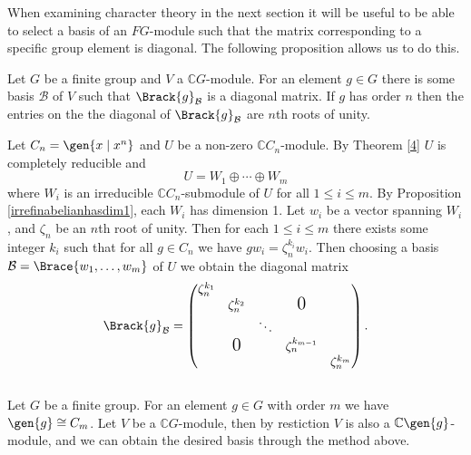 \documentclass[../Project.tex]{subfiles}
\begin{document}
When examining character theory in the next section it will be useful to be able to select a basis of an $FG$-module such that the matrix corresponding to a specific group element is diagonal. The following proposition allows us to do this.

\begin{prop}[{\cite[proposition 9.11]{2}}]
	Let $G$ be a finite group and $V $ a $\mathbb{C}G$-module. For an element $g \in G$ there is some basis $\mathcal{B}$ of $V$  such that $\Brack{g}_\mathcal{B}$ is a diagonal matrix. If $g$ has order $n$ then the entries on the the diagonal of $\Brack{g}_\mathcal{B}$ are $n$th roots of unity.
	\label{diagonalizable}
\end{prop}
\begin{proo*}[{\cite[Proposition 9.11]{2}}]
	Let $C_n = \gen{x \;\vert\; x^n}$ and $U$ be a non-zero $\mathbb{C}C_n$-module. By Theorem \ref{4} $U$ is completely reducible and
	$$U = W_1 \oplus \cdots \oplus W_m$$
	where $W_i$ is an irreducible $\mathbb{C}C_n$-submodule of $U$ for all $1 \leqslant i \leqslant m$. By Proposition \ref{irrefinabelianhasdim1}, each $W_i$ has dimension 1. Let $w_i$ be a vector spanning $W_i$, and $\zeta_n$ be an $n$th root of unity. Then for each $1 \leqslant i \leqslant m$ there exists some integer $k_i$ such that for all $g \in C_n$ we have $gw_i = \zeta_n^{k_i}w_i$. Then choosing a basis $\mathcal{B} = \Brace{w_1,\dots,w_m}$ of $U$ we obtain the diagonal matrix
	$$\Brack{g}_\mathcal{B} = \begin{pmatrix}
	\zeta_n^{k_1} &  & &  & \\
	 & \zeta_n^{k_2} & & \text{\Large{0}}&  \\
	& & \ddots & & \\
	 & \text{\Large{0}} & & \zeta^{k_{m-1}}_n & \\ 
	&  & & & \zeta_n^{k_m}\end{pmatrix}.$$\\

	Let $G$ be a finite group. For an element $g \in G$ with order $m$ we have $\gen{g} \cong C_m$. Let $V$ be a $\mathbb{C}G$-module, then by restiction $V$ is also a $\mathbb{C}\gen{g}$-module, and we can obtain the desired basis through the method above.

\end{proo*}
\end{document}
